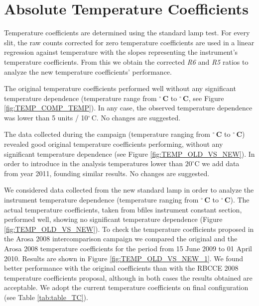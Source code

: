 

\section{Absolute Temperature Coefficients} \label{sec:TC}
Temperature coefficients are determined using the standard lamp test.
For every slit, the raw counts corrected for zero temperature coefficients are used in a linear regression against temperature  with the slopes representing the instrument's temperature coefficients. From this we obtain the corrected \emph{R6} and \emph{R5} ratios to analyze the new temperature coefficients' performance.


The original temperature coefficients performed well without any significant temperature dependence (temperature range from \textbf{\tempmin$^\circ$\,C} to \textbf{\tempmax$^\circ$\,C}, see Figure \ref{fig:TEMP_COMP_TEMP}). In any case, the observed temperature dependence was lower than 5 units / 10$^\circ$\,C. No changes are suggested.

The data collected during the campaign (temperature ranging from \textbf{\tempmin$^\circ$\,C} to \textbf{\tempmax$^\circ$\,C}) revealed good original temperature coefficients performing, without any significant temperature dependence (see Figure \ref{fig:TEMP_OLD_VS_NEW}). In order to introduce in the analysis temperatures lower than $20^\circ$C we add data from year 2011, founding similar results. No changes are suggested.
\vspace{1.5cm}


We considered data collected from the new standard lamp in order to analyze the instrument temperature dependence (temperature ranging from \textbf{\tempmin$^\circ$\,C} to \textbf{\tempmax$^\circ$\,C}). The actual temperature coefficients, taken from bfiles instrument constant section, performed well, showing no significant temperature dependence (Figure \ref{fig:TEMP_OLD_VS_NEW}). To check the temperature coefficients proposed in the Arosa 2008 intercomparison campaign we compared the original and the Arosa 2008 temperature coefficients for the period from 15 June 2009 to 01 April 2010. Results are shown in Figure \ref{fig:TEMP_OLD_VS_NEW_1}. We found better performance with the original coefficients than with the RBCCE 2008 temperature coefficients proposal, although in both cases the results obtained are acceptable. We adopt the current temperature coefficients on final configuration (see Table \ref{tab:table_TC}).

